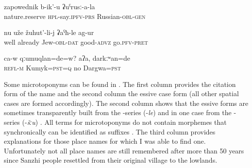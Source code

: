 		
		
\begin{exe}
	\ex	\label{ex:This is called nature reserve in Russian}
	\gll	zapowednik	b-ik'-u	ʡuˁrusː-a-la  \\
		nature.reserve	\textsc{hpl}-say.\textsc{ipfv-prs}	Russian-\textsc{obl-gen}\\
	\glt	{}

	\ex	\label{ex:Well, the Jew already felt better}
	\gll	nu	uže	žuhut'-li-j	ʡaˁħ-le	ag-ur   \\
		well	already	Jew-\textsc{obl-dat}	good-\textsc{advz}	go.\textsc{pfv-pret}\\
	\glt	{}

	\ex	\label{ex:Was he Kumyk No (he) was Dargwa}
	\gll	ca-w	qːumuqlan=de=w?	aʔa,	darkːʷan=de   \\
		\textsc{refl-m}	Kumyk=\textsc{pst=q} no Dargwa=\textsc{pst}\\
	\glt	{}
\end{exe}

Some microtoponyms can be found in . The first column provides the citation form of the name and the second column the essive case form (all other spatial cases are formed accordingly). The second column shows that the essive forms are sometimes transparently built from the -series (-\textit{le}) and in one case from the -series (-\textit{šːu}) . All terms for microtoponyms do not contain morphemes that synchronically can be identified as  suffixes . The third column provides explanations for those place names for which I was able to find one. Unfortunately not all place names are still remembered after more than 50 years since Sanzhi people resettled from their original village to the lowlands.\largerpage


